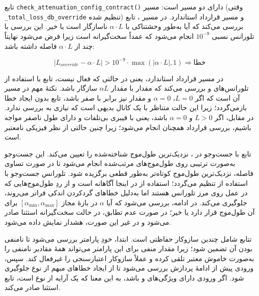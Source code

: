تابع \texttt{check\_attenuation\_config\_contract()} دارای دو مسیر است: مسیر  (وقتی \texttt{\_total\_loss\_db\_override} تنظیم شده) و مسیر قرارداد استاندارد. در مسیر ، تابع بررسی می‌کند که آیا  به‌طور وحشتناکی با $\alpha \cdot L$ ناسازگار است یا خیر. این بررسی با تلورانس نسبی $10^{-9}$ انجام می‌شود که عمداً سخت‌گیرانه است زیرا فرض می‌شود  نهایتاً چند  از $\alpha \cdot L$ فاصله داشته باشد:

\begin{equation}
	\left| L_{override} - \alpha \cdot L \right| > 10^{-9} \cdot \max\left( \left| \alpha \cdot L \right|, 1 \right) \Rightarrow \text{خطا}
\end{equation}

در مسیر قرارداد استاندارد، یعنی در حالتی که  فعال نیست، تابع با استفاده از تلورانس‌های  و  بررسی می‌کند که مقدار  با مقدار $\alpha L$ سازگار باشد. نکتهٔ مهم در مسیر  آن است که اگر $L = 0$، $\alpha = 0$ و مقدار  نیز برابر با صفر باشد، تابع بدون ایجاد خطا بازمی‌گردد؛ زیرا این حالت متناظر با یک کانال بدیهی است که نیازی به بررسی ندارد. در مقابل، اگر $L > 0$ و $\alpha = 0$ باشد، یعنی با فیبری بی‌تلفات و دارای طول ناصفر مواجه باشیم، بررسی قرارداد همچنان انجام می‌شود؛ زیرا چنین حالتی از نظر فیزیکی نامعتبر است.

تابع  با جست‌وجو در ، نزدیک‌ترین طول‌موج شناخته‌شده را تعیین می‌کند. این جست‌وجو به‌صورت ترتیبی روی طول‌موج‌های مرتب‌شده انجام می‌شود تا در صورت تساوی فاصله، نزدیک‌ترین طول‌موج کوتاه‌تر به‌طور قطعی برگزیده شود. تلورانس جست‌وجو با استفاده از  تنظیم می‌گردد؛ استفاده از  در اینجا آگاهانه است و از ردِ طول‌موج‌هایی که در عمل روی مرز تلورانس هستند اما به‌دلیل خطاهای گردکردن  اندکی فراتر می‌روند، جلوگیری می‌کند. در ادامه، بررسی می‌شود که آیا $\alpha$ در بازهٔ مجاز $[\alpha_{\min}, \alpha_{\max}]$ برای آن طول‌موج قرار دارد یا خیر؛ در صورت عدم تطابق، در حالت سخت‌گیرانه استثنا صادر می‌شود و در غیر این صورت، هشدار  نمایش داده می‌شود.


تتابع  شامل چندین سازوکار حفاظتی است. ابتدا، خودِ پارامتر  بررسی می‌شود تا نامنفی بودن آن تضمین شود؛ زیرا مقدار منفی برای این پارامتر می‌تواند همهٔ مقادیر نامنفی را به‌صورت خاموش معتبر تلقی کرده و عملاً سازوکار اعتبارسنجی را غیرفعال کند. سپس، ورودی پیش از ادامهٔ پردازش بررسی می‌شود تا از ایجاد خطاهای مبهم از نوع  جلوگیری شود. اگر ورودی دارای ویژگی‌های  و  باشد، به این معنا که یک آرایه از نوع  است، تابع استثنا صادر می‌کند.

